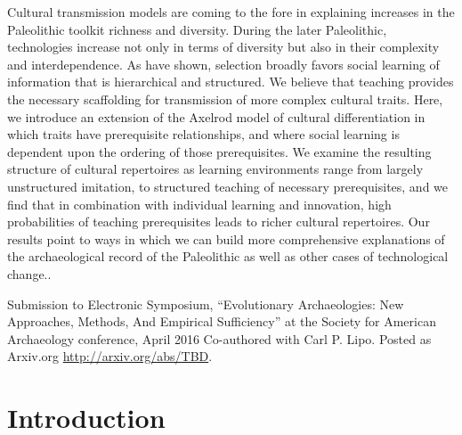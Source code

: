 
\begin{description}[leftmargin=-1\labelwidth]
\item[\textsc{Abstract}] Cultural transmission models are coming to the fore in explaining increases in the Paleolithic toolkit richness and diversity. During the later Paleolithic, technologies increase not only in terms of diversity but also in their complexity and interdependence. As \citet{Mesoudi2008a} have shown, selection broadly favors social learning of information that is hierarchical and structured.  We believe that teaching provides the necessary scaffolding for transmission of more complex cultural traits.  Here, we introduce an extension of the Axelrod \citeyearpar{axelrod1997} model of cultural differentiation in which traits have prerequisite relationships, and where social learning is dependent upon the ordering of those prerequisites. We examine the resulting structure of cultural repertoires as learning environments range from largely unstructured imitation, to structured teaching of necessary prerequisites, and we find that in combination with individual learning and innovation, high probabilities of teaching prerequisites leads to richer cultural repertoires.  Our results point to ways in which we can build more comprehensive explanations of the archaeological record of the Paleolithic as well as other cases of technological change..

\item[\textsc{Source}]  Submission to Electronic Symposium, ``Evolutionary Archaeologies: New Approaches, Methods, And Empirical
Sufficiency'' at the Society for American Archaeology conference, April 2016  Co-authored with Carl P. Lipo.  Posted as Arxiv.org \url{http://arxiv.org/abs/TBD}.
\end{description}





\section{Introduction}\label{introduction}

